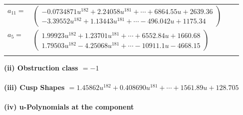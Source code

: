 \documentclass[1p]{elsarticle_modified}
\theoremstyle{definition}
\begin{document}
\begin{tabular}{m{7pt} m{180pt} m{7pt} m{180pt} }
\flushright $a_{11}=$&$\begin{pmatrix}-0.0734871 u^{182}+2.24058 u^{181}+\cdots+6864.55 u+2639.36\\-3.39552 u^{182}+1.13443 u^{181}+\cdots-496.042 u+1175.34\end{pmatrix}$ \\
\flushright $a_{5}=$&$\begin{pmatrix}1.99923 u^{182}+1.23701 u^{181}+\cdots+6552.84 u+1660.68\\1.79503 u^{182}-4.25068 u^{181}+\cdots-10911.1 u-4668.15\end{pmatrix}$\\&\end{tabular}
\flushleft \textbf{(ii) Obstruction class $= -1$}\\~\\
\flushleft \textbf{(iii) Cusp Shapes $= 1.45862 u^{182}+0.408690 u^{181}+\cdots+1561.89 u+128.705$}\\~\\
\newpage\renewcommand{\arraystretch}{1}
\flushleft \textbf{(iv) u-Polynomials at the component}\newline \\
\end{document}
